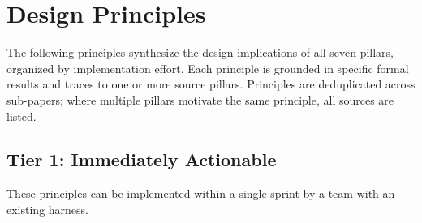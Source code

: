 \documentclass[11pt, a4paper, logo, copyright]{googledeepmind}
\begin{document}
\section{Design Principles}
\label{sec:principles}

The following principles synthesize the design implications of all seven pillars, organized by implementation effort. Each principle is grounded in specific formal results and traces to one or more source pillars. Principles are deduplicated across sub-papers; where multiple pillars motivate the same principle, all sources are listed.

\subsection{Tier 1: Immediately Actionable}
\label{sec:tier1}

These principles can be implemented within a single sprint by a team with an existing harness.
\end{document}
